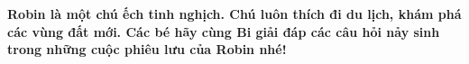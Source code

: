 \graphicspath{{../giaitoancungbi/robin/}}
\begingroup
{} %
\centering
\endgroup
\vspace*{50pt}

\textbf{\color{abc}Robin là một chú ếch tinh nghịch. Chú luôn thích đi du lịch, khám phá các vùng đất mới. Các bé hãy cùng Bi giải đáp các câu hỏi nảy sinh trong những cuộc phiêu lưu của Robin nhé!}

